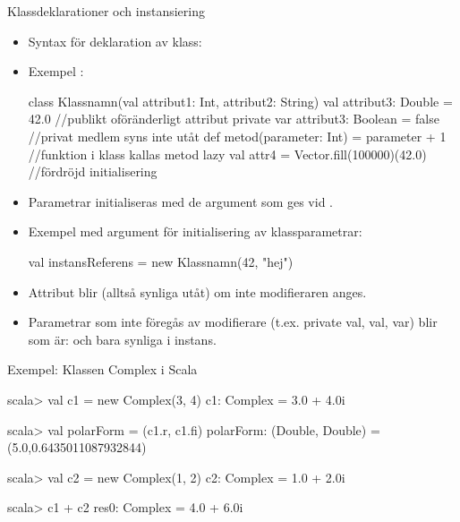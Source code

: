 \begin{Slide}{Klassdeklarationer och instansiering}\SlideFontSmall
\setlength{\leftmargini}{0pt}
\begin{itemize}
\item Syntax för deklaration av klass: \\ \vspace{0.5em}



\item Exempel :
\begin{Code}
class Klassnamn(val attribut1: Int, attribut2: String){  
  val attribut3: Double = 42.0              //publikt oföränderligt attribut
  private var attribut3: Boolean = false    //privat medlem syns inte utåt
  def metod(parameter: Int) = parameter + 1 //funktion i klass kallas metod
  lazy val attr4 = Vector.fill(100000)(42.0)     //fördröjd initialisering 
}
\end{Code}

\item Parametrar initialiseras med de argument som ges vid . 
\item Exempel  med argument för initialisering av klassparametrar:
\begin{Code}
val instansReferens = new Klassnamn(42, "hej")
\end{Code}

\item Attribut blir  (alltså synliga utåt) om inte modifieraren  anges.
\item Parametrar som inte föregås av modifierare (t.ex. private val, val, var) blir  som är:  och bara synliga i  instans.

\end{itemize}
\end{Slide}


\begin{Slide}{Exempel: Klassen Complex i Scala}\SlideFontSmall
{}

\begin{REPL}
scala> val c1 = new Complex(3, 4)
c1: Complex = 3.0 + 4.0i

scala> val polarForm = (c1.r, c1.fi)
polarForm: (Double, Double) = (5.0,0.6435011087932844)

scala> val c2 = new Complex(1, 2)
c2: Complex = 1.0 + 2.0i

scala> c1 + c2
res0: Complex = 4.0 + 6.0i
\end{REPL}
\end{Slide}



